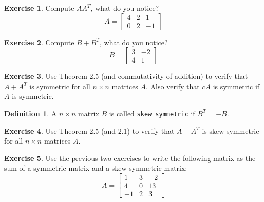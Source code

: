 \documentclass[handout]{beamer}
\newcommand{\fn}{\insertframenumber}
\theoremstyle{definition}
\newtheorem{exercise}{Exercise}
\newtheorem*{defn}{Definition}
\renewcommand{\emph}[1]{{\color{blue}\texttt{#1}}}
\begin{document}
\begin{frame}{\fn}
	\begin{exercise}
		Compute $AA^T$, what do you notice?
	\[A=\begin{bmatrix}
		4&2&1\\0&2&-1
	\end{bmatrix}\]
	\end{exercise}
	\begin{exercise}
		Compute $B+B^T$, what do you notice?
			\[B=\begin{bmatrix}
			3&-2\\4&1
			\end{bmatrix}\]
	\end{exercise}
\end{frame}

\begin{frame}{\fn}
	\begin{exercise}
		Use Theorem 2.5 (and commutativity of addition) to verify that $A+A^T$ is symmetric for all $n\times n$ matrices $A$. Also verify that $cA$ is symmetric if $A$ is symmetric.
	\end{exercise}
	\begin{defn}
		A $n\times n$ matrix $B$ is called \emph{skew symmetric} if $B^T=-B$.
	\end{defn}
	\begin{exercise}
		Use Theorem 2.5 (and 2.1) to verify that $A-A^T$ is skew symmetric for all $n\times n$ matrices $A$.
	\end{exercise}
\end{frame}
\begin{frame}{\fn}
	\begin{exercise}
		Use the previous two exercises to write the following matrix as the sum of a symmetric matrix and a skew symmetric matrix: \[A=\begin{bmatrix}
		1&3&-2\\4&0&13\\-1&2&3
		\end{bmatrix}\]
	\end{exercise}
\end{frame}
\end{document}
